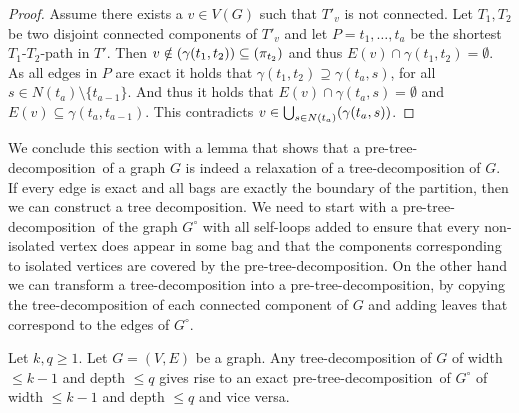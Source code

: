 \documentclass{lmcs}
\theoremstyle{plain}\newtheorem{claim}[thm]{Claim}   %
\let\boundary\relax
\newcommand{\boundary}{\Delta}
\newcommand{\preTreeDec}{pre-tree-decomposition}
\begin{document}
\begin{proof}
	Assume there exists a $v\in V(G)$ such that $T'_v$ is not connected.
	Let $T_1,T_2$ be two disjoint connected components of $T'_v$ and let $P=t_1,\ldots,t_a$ be the shortest $T_1$-$T_2$-path in $T'$.
	Then $v\notin \boundary(\gamma(t_1,t_2))\subseteq \boundary(\pi_{t_2})$ and thus $E(v)\cap \gamma(t_1,t_2)=\emptyset$.
	As all edges in $P$ are exact it holds that $\gamma(t_1,t_2)\supseteq \gamma(t_a,s)$, for all $s\in N(t_a) \setminus\{t_{a-1}\}$.
	And thus it holds that $E(v)\cap \gamma(t_a,s)=\emptyset$ and $E(v)\subseteq \gamma(t_a,t_{a-1})$.
	This contradicts $v\in\bigcup_{s\in N(t_a)} \boundary(\gamma(t_a,s))$.
\end{proof}

We conclude this section with a lemma that shows that a \preTreeDec\ of a graph $G$ is indeed a relaxation of a tree-decomposition of $G$.
If every edge is exact and all bags are exactly the boundary of the partition, then we can construct a tree decomposition.
We need to start with a \preTreeDec\ of the graph $G^\circ$ with all self-loops added to ensure that every non-isolated vertex does appear in some bag and that the components corresponding to isolated vertices are covered by the \preTreeDec.
On the other hand we can transform a tree-decomposition into a \preTreeDec, by copying the tree-decomposition of each connected component of $G$ and adding leaves that correspond to the edges of $G^\circ$.

\begin{lem}\label{lem:exact-and-tdec}
	\label{lem:tw-ptw}
	Let $k,q\geq 1$.
	Let $G=(V,E)$ be a graph.
	Any tree-decomposition of $G$ of width $\leq k-1$ and depth $\leq q$ gives rise to an exact \preTreeDec\ of $G^\circ$ of width $\leq k-1$ and depth $\leq q$ and vice versa.
\end{lem}
\end{document}
